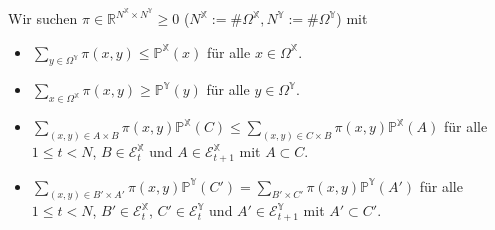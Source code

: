Wir suchen $\pi \in \mathbb{R}^{N^\mathbb{X}\times N^\mathbb{Y}} \geq 0$ ($N^\mathbb{X} := \# \Omega^\mathbb{X}, N^\mathbb{Y}:=\#\Omega^\mathbb{Y}$) mit 
\begin{itemize}
    \item $\sum_{y \in \Omega^\mathbb{Y}} \pi(x,y) \leq \mathbb{P}^\mathbb{X}(x)$ für alle $x \in \Omega^\mathbb{X}$.
    \item $\sum_{x \in \Omega^\mathbb{X}} \pi(x,y) \geq \mathbb{P}^\mathbb{Y}(y)$ für alle $y \in \Omega^\mathbb{Y}$.
    \item $\sum_{(x,y) \in A\times B} \pi(x,y) \mathbb{P}^\mathbb{X}(C) \leq \sum_{(x,y) \in C \times B} \pi(x,y) \mathbb{P}^\mathbb{X}(A)$ für alle $1 \leq t < N$, $B \in \mathcal{E}_t^\mathbb{X}$ und $A \in \mathcal{E}_{t+1}^\mathbb{X}$ mit $A \subset C$.
    \item $\sum_{(x,y) \in B' \times A'} \pi(x,y) \mathbb{P}^\mathbb{Y}(C') = \sum_{B' \times C'} \pi(x,y) \mathbb{P}^\mathbb{Y}(A')$ für alle $1 \leq t < N$, $B' \in \mathcal{E}_t^\mathbb{X}$, $C' \in \mathcal{E}_t^\mathbb{Y}$ und $A' \in \mathcal{E}_{t+1}^\mathbb{Y}$ mit $A' \subset C'$.
\end{itemize}
